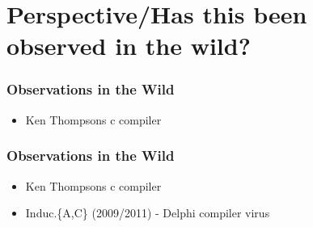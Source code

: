 \section{Perspective/Has this been observed in the wild?}

\begin{frame}
  \frametitle{Observations in the Wild}
%
  \begin{itemize}
  \item Ken Thompsons c compiler
  \end{itemize}
%
\end{frame}

\begin{frame}
  \frametitle{Observations in the Wild}
%
  \begin{itemize}
  \item Ken Thompsons c compiler
  \item Induc.\{A,C\} (2009/2011) - Delphi compiler virus
  \end{itemize}
%
\end{frame}
